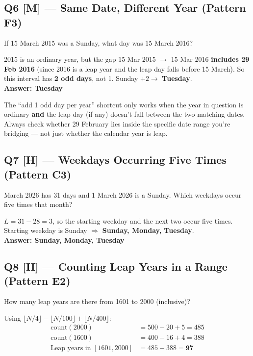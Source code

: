 \documentclass[11pt]{article}
\begin{document}
\subsection*{Q6 [M] --- Same Date, Different Year (Pattern F3)}
If 15 March 2015 was a Sunday, what day was 15 March 2016?

\begin{tipbox}[Solution]
2015 is an ordinary year, but the gap 15 Mar 2015 $\to$ 15 Mar 2016 \textbf{includes 29 Feb 2016}
(since 2016 is a leap year and the leap day falls before 15 March). So this interval has
\textbf{2 odd days}, not 1. Sunday $+2 \to$ \textbf{Tuesday}.\\
\textbf{Answer: Tuesday}
\end{tipbox}

\begin{warnbox}
The ``add 1 odd day per year'' shortcut only works when the year in question is ordinary
\textbf{and} the leap day (if any) doesn't fall between the two matching dates. Always check whether
29 February lies inside the specific date range you're bridging --- not just whether the calendar
year is leap.
\end{warnbox}

\subsection*{Q7 [H] --- Weekdays Occurring Five Times (Pattern C3)}
March 2026 has 31 days and 1 March 2026 is a Sunday. Which weekdays occur five times that month?

\begin{tipbox}[Solution]
$L = 31-28=3$, so the starting weekday and the next two occur five times. Starting weekday is Sunday
$\Rightarrow$ \textbf{Sunday, Monday, Tuesday}.\\
\textbf{Answer: Sunday, Monday, Tuesday}
\end{tipbox}

\subsection*{Q8 [H] --- Counting Leap Years in a Range (Pattern E2)}
How many leap years are there from 1601 to 2000 (inclusive)?

\begin{tipbox}[Solution]
Using $\lfloor N/4\rfloor - \lfloor N/100\rfloor + \lfloor N/400\rfloor$:
\begin{align*}
\text{count}(2000) &= 500-20+5=485\\
\text{count}(1600) &= 400-16+4=388\\
\text{Leap years in }[1601,2000] &= 485-388 = \textbf{97}
\end{align*}
\end{tipbox}
\end{document}
